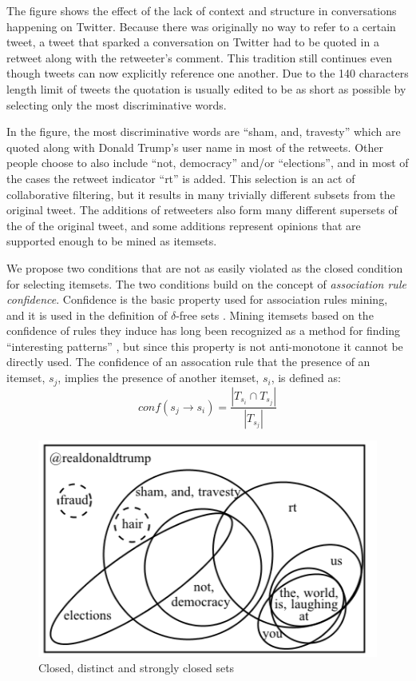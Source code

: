 \documentclass[letterpaper,12pt,titlepage,oneside,final]{book}
\begin{document}
The figure shows the effect of the lack of context and structure in
conversations happening on Twitter.
Because there was originally no way to refer to a certain tweet,
a tweet that sparked a conversation on Twitter had to be quoted in a retweet
along with the retweeter's comment.
This tradition still continues even though tweets can now explicitly reference
one another. 
Due to the 140 characters length limit of tweets the quotation is usually 
edited to be as short as possible by selecting only the most discriminative
words. 

In the figure, the most discriminative words are ``sham, and, travesty''
which are quoted along with Donald Trump's user name in most of the retweets.
Other people choose to also include ``not, democracy'' and/or ``elections'',
and in most of the cases the retweet indicator ``rt'' is added. 
This selection is an act of collaborative filtering,
but it results in many trivially different subsets from the original tweet.
The additions of retweeters also form many different supersets of the of the
original tweet, and some additions represent opinions that are supported
enough to be mined as itemsets. 

We propose two conditions that are not as easily violated as the closed
condition for selecting itemsets.
The two conditions build on the concept of \emph{association rule confidence}.
Confidence is the basic property used for association rules mining,
and it is used in the definition of $\delta$-free sets \cite{boulicaut2003free}.
Mining itemsets based on the confidence of rules they induce has long been
recognized as a method for finding
``interesting patterns'' \cite{cohen2001finding},
but since this property is not anti-monotone 
it cannot be directly used.
The confidence of an assocation rule that the presence of an itemset,
$s_{j}$, implies the presence of another itemset, $s_i$, is  defined as:
\begin{equation}\label{eq:conf}conf(s_j \rightarrow s_i) = \frac{|T_{s_i} \cap T_{s_j}|}{|T_{s_j}|}\end{equation}

\begin{figure}
\centering
\includegraphics{sham.png}
\caption{Closed, distinct and strongly closed sets}
\label{fig:sham}
\end{figure}
\end{document}

